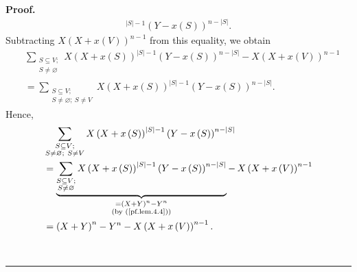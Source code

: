 \documentclass[numbers=enddot,12pt,final,onecolumn,notitlepage]{scrartcl}%
\theoremstyle{definition}
\newenvironment{proof}[1][Proof]{\noindent\textbf{#1.} }{\ \rule{0.5em}{0.5em}}
\let\sumnonlimits\sum
\renewcommand{\sum}{\sumnonlimits\limits}
\newenvironment{verlong}{}{}
\begin{document}
\begin{verlong}
\begin{proof}
\begin{align*}
^{\left\vert S\right\vert -1}\left(  Y-x\left(  S\right)  \right)
^{n-\left\vert S\right\vert }.
\end{align*}
Subtracting $X\left(  X+x\left(  V\right)  \right)  ^{n-1}$ from this
equality, we obtain%
\begin{align*}
&  \sum_{\substack{S\subseteq V;\\S\neq\varnothing}}X\left(  X+x\left(
S\right)  \right)  ^{\left\vert S\right\vert -1}\left(  Y-x\left(  S\right)
\right)  ^{n-\left\vert S\right\vert }-X\left(  X+x\left(  V\right)  \right)
^{n-1}\\
&  =\sum_{\substack{S\subseteq V;\\S\neq\varnothing;\ S\neq V}}X\left(
X+x\left(  S\right)  \right)  ^{\left\vert S\right\vert -1}\left(  Y-x\left(
S\right)  \right)  ^{n-\left\vert S\right\vert }.
\end{align*}
Hence,%
\begin{align}
&  \sum_{\substack{S\subseteq V;\\S\neq\varnothing;\ S\neq V}}X\left(
X+x\left(  S\right)  \right)  ^{\left\vert S\right\vert -1}\left(  Y-x\left(
S\right)  \right)  ^{n-\left\vert S\right\vert }\nonumber\\
&  =\underbrace{\sum_{\substack{S\subseteq V;\\S\neq\varnothing}}X\left(
X+x\left(  S\right)  \right)  ^{\left\vert S\right\vert -1}\left(  Y-x\left(
S\right)  \right)  ^{n-\left\vert S\right\vert }}_{\substack{=\left(
X+Y\right)  ^{n}-Y^{n}\\\text{(by (\ref{pf.lem.4.4}))}}}-\,X\left(  X+x\left(
V\right)  \right)  ^{n-1}\nonumber\\
&  =\left(  X+Y\right)  ^{n}-Y^{n}-X\left(  X+x\left(  V\right)  \right)
^{n-1}. \label{pf.lem.4.6}%
\end{align}



\end{proof}
\end{verlong}
\end{document}
